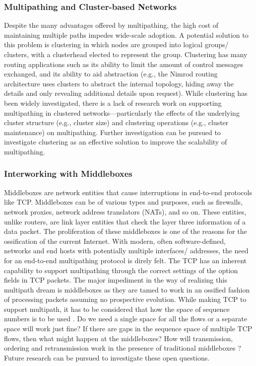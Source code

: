 \documentclass[10pt]{IEEEtran}
\begin{document}
\vspace{2mm}
\subsubsection{Multipathing and Cluster-based Networks}

Despite the many advantages offered by multipathing, the high cost of maintaining multiple paths impedes wide-scale adoption. A potential solution to this problem is clustering in which nodes are grouped into logical groups/ clusters, with a clusterhead elected to represent the group. Clustering has many routing applications such as its ability to limit the amount of control messages exchanged, and its ability to aid abstraction (e.g., the Nimrod routing architecture \cite{castineyra1992nimrod} uses clusters to abstract the internal topology, hiding away the details and only revealing additional details upon request).  While clustering has been widely investigated, there is a lack of research work on supporting multipathing in clustered networks---particularly the effects of the underlying cluster structure (e.g., cluster size) and clustering operations (e.g., cluster maintenance) on multipathing. Further investigation can be pursued to investigate clustering as an effective solution to improve the scalability of multipathing.



\vspace{2mm}
\subsubsection{Interworking with Middleboxes}

Middleboxes are network entities that cause interruptions in end-to-end protocols like TCP. Middleboxes can be of various types and purposes, such as firewalls, network proxies, network address translators (NATs), and so on. These entities, unlike routers, are link layer entities that check the layer three information of a data packet. The proliferation of these middleboxes is one of the reasons for the ossification of the current Internet. With modern, often software-defined, networks and end hosts with potentially multiple interfaces/ addresses, the need for an end-to-end multipathing protocol is direly felt. The TCP has an inherent capability to support multipathing through the correct settings of the option fields in TCP packets. The major impediment in the way of realizing this multipath dream is middleboxes as they are tamed to work in an ossified fashion of processing packets assuming no prospective evolution. While making TCP to support multipath, it has to be considered that how the space of sequence numbers is to be used \cite{honda2011still, raiciu2012hard}. Do we need a single space for all the flows or a separate space will work just fine? If there are gaps in the sequence space of multiple TCP flows, then what might happen at the middleboxes? How will transmission, ordering and retransmission work in the presence of traditional middleboxes \cite{honda2011still, raiciu2012hard}? Future research can be pursued to investigate these open questions.
\end{document}
